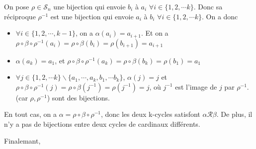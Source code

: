 \documentclass[a4paper,12pt]{book}
\begin{document}
On pose $\rho \in \mathscr{S}_n$ une bijection qui envoie $b_i$ à $a_i$ $\forall i \in\{1,2,\cdots k\} $. Donc sa réciproque $\rho^{-1}$ est une bijection 
qui envoie $a_i$ à $b_i$ $\forall i \in\{1,2,\cdots k\} $. On a donc 
\begin{itemize}
    \item $\forall i \in \{1,2,\cdots,k-1\}$, on a $\alpha(a_i)=a_{i+1}$. Et on a $\rho\circ \beta \circ\rho^{-1}(a_i)=\rho\circ\beta(b_i)=\rho(b_{i+1})=a_{i+1}$
    \item $\alpha(a_k)=a_1$, et $\rho\circ \beta \circ\rho^{-1}(a_k)=\rho\circ \beta(b_k)=\rho(b_1)=a_1$
    \item $\forall j \in\{1,2,\cdots k\}\backslash\{a_1,\cdots, a_k,b_1,\cdots b_k\} $, $\alpha(j)=j$ et $\rho\circ \beta \circ\rho^{-1}(j)=\rho\circ \beta (j^{-1})=\rho(j^{-1})=j$, où
    $j^{-1}$ est l'image de $j$ par $\rho^{-1}$.(car $\rho, \rho^{-1}$) sont des bijections.
\end{itemize}
En tout cas, on a $\alpha=\rho\circ \beta \circ\rho^{-1}$, donc les deux k-cycles satisfont $\alpha \mathcal{R} \beta$. De plus, il n'y a pas de bijections entre deux cycles de cardinaux différents. 

Finalemant, 
\end{document}
